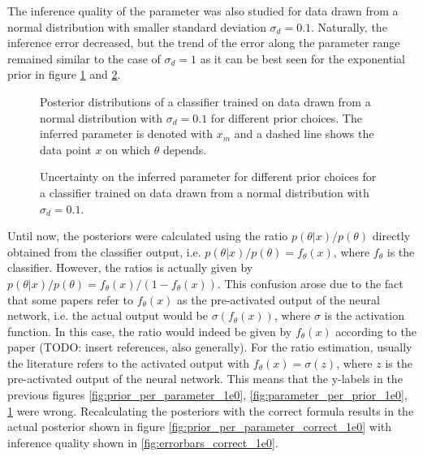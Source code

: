 \documentclass{article}
\begin{document}
\FloatBarrier


The inference quality of the parameter was also studied for data drawn from a normal distribution with smaller standard deviation $\sigma_d=0.1$.
Naturally, the inference error decreased, but the trend of the error along the parameter range remained similar to the case of $\sigma_d=1$ as it can be best seen for the exponential prior in figure \ref{fig:prior_per_parameter_1e-1} and \ref{fig:errorbars_1e-1}.

\begin{figure}[ht]
    \centering
    
    \caption{Posterior distributions of a classifier trained on data drawn from a normal distribution with $\sigma_d=0.1$ for different prior choices. The inferred parameter is denoted with $x_m$ and a dashed line shows the data point $x$ on which $\theta$ depends.}
    \label{fig:prior_per_parameter_1e-1}
\end{figure}
%    
\begin{figure}[ht]
    \centering
    
    \caption{Uncertainty on the inferred parameter for different prior choices for a classifier trained on data drawn from a normal distribution with $\sigma_d=0.1$.}
    \label{fig:errorbars_1e-1}
\end{figure}

\FloatBarrier

Until now, the posteriors were calculated using the ratio $p(\theta|x)/p(\theta)$ directly obtained from the classifier output,
i.e. $p(\theta|x)/p(\theta) = f_\theta(x)$, where $f_\theta$ is the classifier. However, the ratios is actually given by $p(\theta|x)/p(\theta) = f_\theta(x)/(1-f_\theta(x))$.
This confusion arose due to the fact that some papers refer to $f_\theta(x)$ as the pre-activated output of the neural network, i.e. the actual output would be $\sigma(f_\theta(x))$,
where $\sigma$ is the activation function. In this case, the ratio would indeed be given by $f_\theta(x)$ according to the paper (TODO: insert references, also generally).
For the ratio estimation, usually the literature refers to the activated output with $f_\theta(x) = \sigma(z)$, where $z$ is the pre-activated output of the neural network.
This means that the y-labels in the previous figures \ref{fig:prior_per_parameter_1e0}, \ref{fig:parameter_per_prior_1e0}, \ref{fig:prior_per_parameter_1e-1} were wrong.
Recalculating the posteriors with the correct formula results in the actual posterior shown in figure \ref{fig:prior_per_parameter_correct_1e0} with inference quality shown in \ref{fig:errorbars_correct_1e0}.
\end{document}
